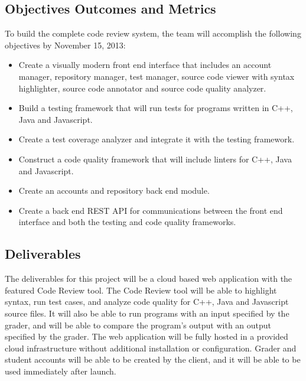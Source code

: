 
\subsection{Objectives Outcomes and Metrics}
To build the complete code review system, the team will accomplish the following
objectives by November 15, 2013:

\begin{itemize}
\item Create a visually modern front end interface that includes an account
manager, repository manager, test manager, source code viewer with syntax
highlighter, source code annotator and source code quality analyzer.

\item Build a testing framework that will run tests for programs written in C++,
Java and Javascript.

\item Create a test coverage analyzer and integrate it with the testing
framework.

\item Construct a code quality framework that will include linters for C++, Java
and Javascript.

\item Create an accounts and repository back end module.

\item Create a back end REST API for communications between the front end
interface and both the testing and code quality frameworks.
\end{itemize}
\subsection{Deliverables}

The deliverables for this project will be a cloud based web application with the
featured Code Review tool. The Code Review tool will be able to highlight
syntax, run test cases, and analyze code quality for C++, Java and Javascript
source files. It will also be able to run programs with an input specified by
the grader, and will be able to compare the program's output with an output
specified by the grader. The web application will be fully hosted in a provided
cloud infrastructure without additional installation or configuration. Grader
and student accounts will be able to be created by the client, and it will be
able to be used immediately after launch.
